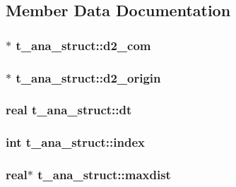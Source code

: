 \subsection{\-Member \-Data \-Documentation}
\hypertarget{structt__ana__struct_a91508dd0e25b61650c527878728c29d4}{
\subsubsection[{d2\-\_\-com}]{$\ast$ {\bf t\-\_\-ana\-\_\-struct\-::d2\-\_\-com}}}\label{structt__ana__struct_a91508dd0e25b61650c527878728c29d4}
\hypertarget{structt__ana__struct_ac22ae41f1edd1144fb1325b1fafcd8ca}{
\subsubsection[{d2\-\_\-origin}]{ $\ast$ {\bf t\-\_\-ana\-\_\-struct\-::d2\-\_\-origin}}}\label{structt__ana__struct_ac22ae41f1edd1144fb1325b1fafcd8ca}
\hypertarget{structt__ana__struct_a94b434b35ad6f9759b11db490874608b}{
\subsubsection[{dt}]{\setlength{\rightskip}{0pt plus 5cm}real {\bf t\-\_\-ana\-\_\-struct\-::dt}}}\label{structt__ana__struct_a94b434b35ad6f9759b11db490874608b}
\hypertarget{structt__ana__struct_aa59e99da4b56fbcc26ecd1b5b2495152}{
\subsubsection[{index}]{\setlength{\rightskip}{0pt plus 5cm}int {\bf t\-\_\-ana\-\_\-struct\-::index}}}\label{structt__ana__struct_aa59e99da4b56fbcc26ecd1b5b2495152}
\hypertarget{structt__ana__struct_a9637f9b6249124cea24ec146e9051bd5}{
\subsubsection[{maxdist}]{\setlength{\rightskip}{0pt plus 5cm}real$\ast$ {\bf t\-\_\-ana\-\_\-struct\-::maxdist}}}\label{structt__ana__struct_a9637f9b6249124cea24ec146e9051bd5}
